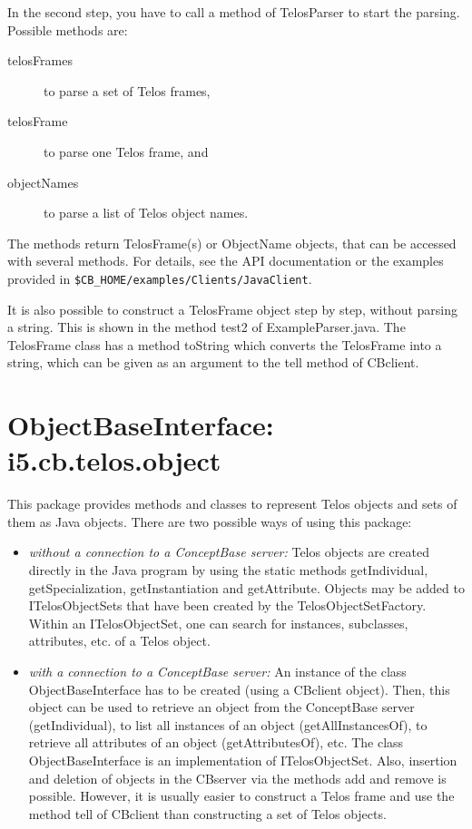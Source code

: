 In the second step, you have to call a method of TelosParser
to start the parsing. Possible methods are:

\begin{description}
\item[telosFrames] to parse a set of Telos frames,
\item[telosFrame] to parse one Telos frame, and
\item[objectNames] to parse a list of Telos object names.
\end{description}

The methods return TelosFrame(s) or ObjectName objects,
that can be accessed with several methods. For details,
see the API documentation or the examples provided
in \verb+$CB_HOME/examples/Clients/JavaClient+.

It is also possible to construct a TelosFrame object
step by step, without parsing a string. This is shown
in the method {\ttfamily test2} of ExampleParser.java.
The TelosFrame class has a method
toString which converts the TelosFrame into a string, which
can be given as an argument to the tell method of CBclient.


\section{ObjectBaseInterface: i5.cb.telos.object}

This package provides methods and classes to represent
Telos objects and sets of them as Java objects.
There are two possible ways of using this package:

\begin{itemize}
\item {\em without a connection to a ConceptBase server:}
Telos objects are created directly in the Java program by using
the static methods {\ttfamily getIndividual}, {\ttfamily getSpecialization}, {\ttfamily getInstantiation}
and {\ttfamily getAttribute}. Objects may be added to
{\ttfamily ITelosObjectSets} that have been created by the
{\ttfamily TelosObjectSetFactory}. Within an {\ttfamily ITelosObjectSet},
one can search for instances, subclasses, attributes, etc.
of a Telos object.
\item {\em with a connection to a ConceptBase server:}
An instance of the class {\ttfamily ObjectBaseInterface} has to be created
(using a CBclient object). Then, this object can be used
to retrieve an object from the ConceptBase server ({\ttfamily getIndividual}),
to list all instances of an object ({\ttfamily getAllInstancesOf}),
to retrieve all attributes of an object ({\ttfamily getAttributesOf}), etc.
The class {\ttfamily ObjectBaseInterface} is an implementation of {\ttfamily ITelosObjectSet}.
Also, insertion and deletion of objects in the CBserver via the methods {\ttfamily add} and {\ttfamily remove}
is possible. However, it is usually easier to construct a Telos frame
and use the method {\ttfamily tell} of {\ttfamily CBclient} than
constructing a set of Telos objects.
\end{itemize}

